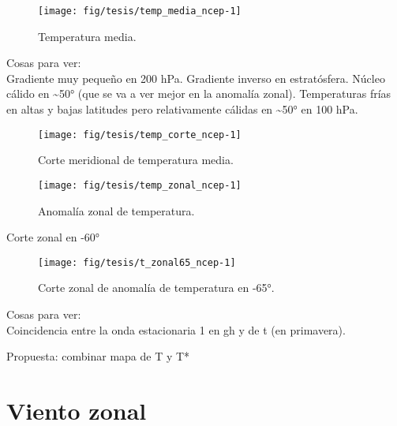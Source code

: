 \documentclass[spanish,a4paper]{book}
\begin{document}
\begin{figure}

{\centering \texttt{[image: fig/tesis/temp\_media\_ncep-1]} 

}

\caption{Temperatura media.}\label{fig:temp_media_ncep}
\end{figure}

Cosas para ver:\\
Gradiente muy pequeño en 200 hPa. Gradiente inverso en estratósfera.
Núcleo cálido en \textasciitilde{}50° (que se va a ver mejor en la
anomalía zonal). Temperaturas frías en altas y bajas latitudes pero
relativamente cálidas en \textasciitilde{}50° en 100 hPa.

\begin{figure}

{\centering \texttt{[image: fig/tesis/temp\_corte\_ncep-1]} 

}

\caption{Corte meridional de temperatura media.}\label{fig:temp_corte_ncep}
\end{figure}

\begin{figure}

{\centering \texttt{[image: fig/tesis/temp\_zonal\_ncep-1]} 

}

\caption{Anomalía zonal de temperatura.}\label{fig:temp_zonal_ncep}
\end{figure}

Corte zonal en -60°

\begin{figure}

{\centering \texttt{[image: fig/tesis/t\_zonal65\_ncep-1]} 

}

\caption{Corte zonal de anomalía de temperatura en -65°.}\label{fig:t_zonal65_ncep}
\end{figure}

Cosas para ver:\\
Coincidencia entre la onda estacionaria 1 en gh y de t (en primavera).

Propuesta: combinar mapa de T y T*

\section{Viento zonal}\label{viento-zonal}
\end{document}
